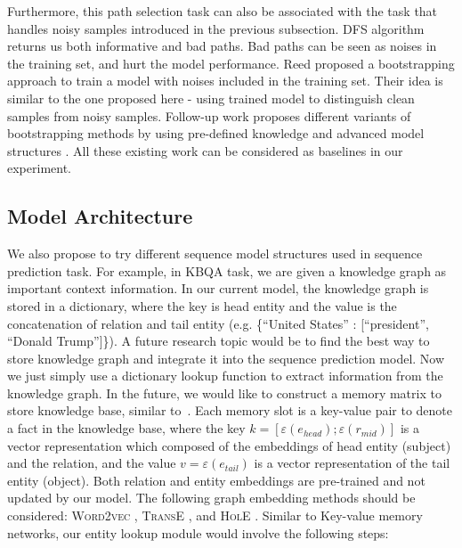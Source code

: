 Furthermore, this path selection task can also be associated with the task that handles noisy samples introduced in the previous subsection. DFS algorithm returns us both informative and bad paths. Bad paths can be seen as noises in the training set, and hurt the model performance. Reed \cite{reed2014training2} proposed a bootstrapping approach to train a model with noises included in the training set. Their idea is similar to the one proposed here - using trained model to distinguish clean samples from noisy samples. Follow-up work proposes different variants of bootstrapping methods by using pre-defined knowledge and advanced model structures \cite{tanaka2018joint,yi2019probabilistic,han2019deep}. All these existing work can be considered as baselines in our experiment.


\subsection{Model Architecture} \label{future_model}

We also propose to try different sequence model structures used in sequence prediction task. For example, in KBQA task, we are given a knowledge graph as important context information. In our current model, the knowledge graph is stored in a dictionary, where the key is head entity and the value is the concatenation of relation and tail entity (e.g. \{``United States'' : [``president'', ``Donald Trump'']\}). A future research topic would be to find the best way to store knowledge graph and integrate it into the sequence prediction model. Now we just simply use a dictionary lookup function to extract information from the knowledge graph. In the future, we would like to construct a memory matrix to store knowledge base, similar to~\cite{DBLP:conf/emnlp/MillerFDKBW16}. Each memory slot is a key-value pair to denote a fact in the knowledge base, where the key $k=[\varepsilon(e_{head});\varepsilon(r_{mid})]$ is a vector representation which composed of the embeddings of head entity (subject) and the relation, and the value $v=\varepsilon(e_{tail})$ is a vector representation of the tail entity (object). Both relation and entity embeddings are pre-trained and not updated by our model. The following graph embedding methods should be considered: \textsc{Word2vec} \cite{DBLP:journals/corr/abs-1301-3781}, \textsc{TransE} \cite{DBLP:conf/nips/BordesUGWY13}, and \textsc{HolE} \cite{DBLP:journals/corr/TrouillonN17}. Similar to Key-value memory networks, our entity lookup module would involve the following steps: 


